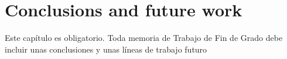\chapter{Conclusions and future work}
\label{cap:conclusions}

Este capítulo es obligatorio.
Toda memoria de Trabajo de Fin de Grado debe incluir unas conclusiones y unas 
líneas de trabajo futuro 

